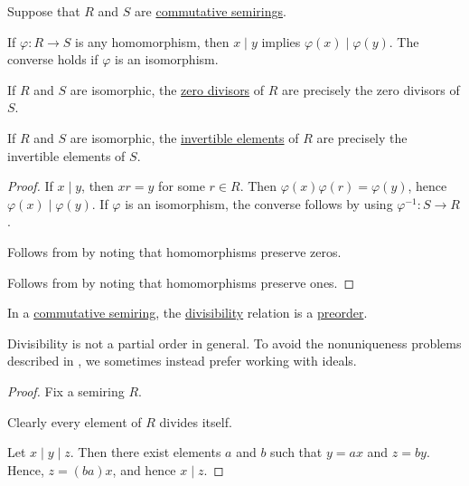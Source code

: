 \begin{proposition}\label{thm:divisibility_and_isomorphisms}
  Suppose that \( R \) and \( S \) are \hyperref[def:semiring/commutative]{commutative semirings}.

  \begin{thmenum}
     If \( \varphi: R \to S \) is any homomorphism, then \( x \mid y \) implies \( \varphi(x) \mid \varphi(y) \). The converse holds if \( \varphi \) is an isomorphism.

     If \( R \) and \( S \) are isomorphic, the \hyperref[def:divisibility/zero]{zero divisors} of \( R \) are precisely the zero divisors of \( S \).

     If \( R \) and \( S \) are isomorphic, the \hyperref[def:divisibility/invertible]{invertible elements} of \( R \) are precisely the invertible elements of \( S \).
  \end{thmenum}
\end{proposition}
\begin{proof}
   If \( x \mid y \), then \( xr = y \) for some \( r \in R \). Then \( \varphi(x) \varphi(r) = \varphi(y) \), hence \( \varphi(x) \mid \varphi(y) \). If \( \varphi \) is an isomorphism, the converse follows by using \( \varphi^{-1}: S \to R \).

   Follows from  by noting that homomorphisms preserve zeros.

   Follows from  by noting that homomorphisms preserve ones.
\end{proof}

\begin{proposition}\label{thm:semiring_divisibility_order}
  In a \hyperref[def:semiring/commutative]{commutative semiring}, the \hyperref[def:divisibility]{divisibility} relation is a \hyperref[def:preordered_set]{preorder}.
\end{proposition}
\begin{comments}
  \item Divisibility is not a partial order in general. To avoid the nonuniqueness problems described in , we sometimes instead prefer working with ideals.
\end{comments}
\begin{proof}
  Fix a semiring \( R \).

   Clearly every element of \( R \) divides itself.

   Let \( x \mid y \mid z \). Then there exist elements \( a \) and \( b \) such that \( y = a x \) and \( z = b y \). Hence, \( z = (ba) x \), and hence \( x \mid z \).
\end{proof}

